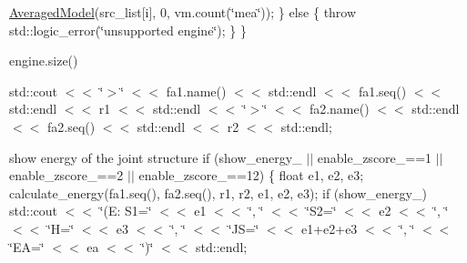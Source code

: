 \hyperlink{class_averaged_model}{Averaged\+Model}(src\+\_\+list\mbox{[}i\mbox{]}, 0, vm.\+count(\char`\"{}mea\char`\"{})); \} else \{ throw std\+::logic\+\_\+error(\char`\"{}unsupported engine\char`\"{}); \} \}

engine.\+size()

std\+::cout $<$$<$ \char`\"{}$>$\char`\"{} $<$$<$ fa1.\+name() $<$$<$ std\+::endl $<$$<$ fa1.\+seq() $<$$<$ std\+::endl $<$$<$ r1 $<$$<$ std\+::endl $<$$<$ \char`\"{}$>$\char`\"{} $<$$<$ fa2.\+name() $<$$<$ std\+::endl $<$$<$ fa2.\+seq() $<$$<$ std\+::endl $<$$<$ r2 $<$$<$ std\+::endl;

show energy of the joint structure if (show\+\_\+energy\+\_\+ $\vert$$\vert$ enable\+\_\+zscore\+\_\+==1 $\vert$$\vert$ enable\+\_\+zscore\+\_\+==2 $\vert$$\vert$ enable\+\_\+zscore\+\_\+==12) \{ float e1, e2, e3; calculate\+\_\+energy(fa1.\+seq(), fa2.\+seq(), r1, r2, e1, e2, e3); if (show\+\_\+energy\+\_\+) std\+::cout $<$$<$ \char`\"{}(\+E\+: S1=\char`\"{} $<$$<$ e1 $<$$<$ \char`\"{}, \char`\"{} $<$$<$ \char`\"{}\+S2=\char`\"{} $<$$<$ e2 $<$$<$ \char`\"{}, \char`\"{} $<$$<$ \char`\"{}\+H=\char`\"{} $<$$<$ e3 $<$$<$ \char`\"{}, \char`\"{} $<$$<$ \char`\"{}\+J\+S=\char`\"{} $<$$<$ e1+e2+e3 $<$$<$ \char`\"{}, \char`\"{} $<$$<$ \char`\"{}\+E\+A=\char`\"{} $<$$<$ ea $<$$<$ \char`\"{})\char`\"{} $<$$<$ std\+::endl;

